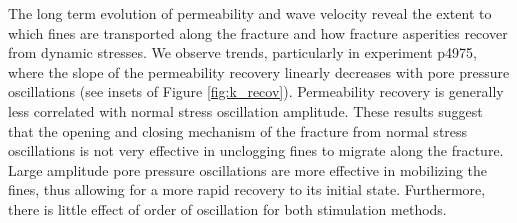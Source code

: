 \documentclass[draft]{agujournal2019}
\begin{document}
The long term evolution of permeability and wave velocity reveal the extent to which fines are transported along the fracture and how fracture asperities recover from dynamic stresses. We observe trends, particularly in experiment p4975, where the slope of the permeability recovery linearly decreases with pore pressure oscillations (see insets of Figure \ref{fig:k_recov}). Permeability recovery is generally less correlated with normal stress oscillation amplitude. These results suggest that the opening and closing mechanism of the fracture from normal stress oscillations is not very effective in unclogging fines to migrate along the fracture. Large amplitude pore pressure oscillations are more effective in mobilizing the fines, thus allowing for a more rapid recovery to its initial state. Furthermore, there is little effect of order of oscillation for both stimulation methods. 
\end{document}
